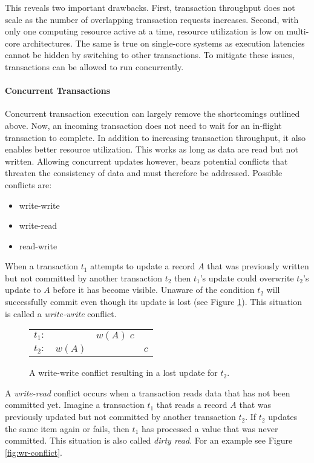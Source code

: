 This reveals two important drawbacks. First, transaction throughput does not
scale as the number of overlapping transaction requests increases. Second, with
only one computing resource active at a time, resource utilization is low on
multi-core architectures. The same is true on single-core systems as execution
latencies cannot be hidden by switching to other transactions. To mitigate these
issues, transactions can be allowed to run concurrently.

\paragraph{Concurrent Transactions}

Concurrent transaction execution can largely remove the shortcomings outlined above. Now, an incoming transaction does not need to wait for an in-flight transaction to complete. In addition to increasing transaction throughput, it also enables better resource utilization. This works as long as data are read but not written. Allowing concurrent updates however, bears potential conflicts that threaten the consistency of data and must therefore be addressed. Possible conflicts are:

\begin{itemize}
    \item write-write
    \item write-read
    \item read-write
\end{itemize}

When a transaction $t_1$ attempts to update a record $A$ that was previously
written but not committed by another transaction $t_2$ then $t_1$'s update could
overwrite $t_2$'s update to $A$ before it has become visible. Unaware of the
condition $t_2$ will successfully commit even though its update is lost (see
Figure \ref{fig:ww-conflict}). This situation is called a \emph{write-write}
conflict.

\begin{figure}[h!]
    \centering
    \begin{tabular}{r c c c}
        $t_1:$ &        & $w(A)\; c$ & \\
        $t_2:$ & $w(A)$ &            & $c$ \\
    \end{tabular}
    \caption{A write-write conflict resulting in a lost update for $t_2$.}
    \label{fig:ww-conflict}
\end{figure}

A \emph{write-read} conflict occurs when a transaction reads data that has not
been committed yet. Imagine a transaction $t_1$ that reads a record $A$ that was
previously updated but not committed by another transaction $t_2$. If $t_2$
updates the same item again or fails, then $t_1$ has processed a value that was
never committed. This situation is also called \emph{dirty read}. For an example see Figure \ref{fig:wr-conflict}.

